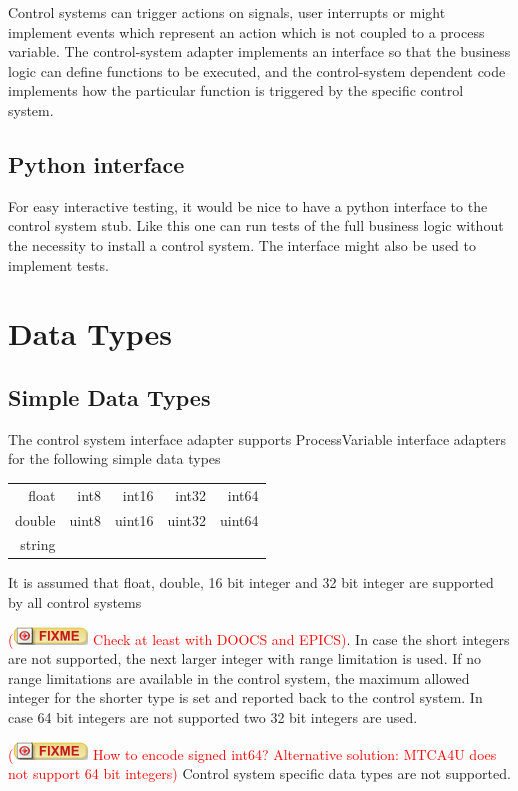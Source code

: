 \documentclass[11pt,a4paper]{scrartcl}
\newcounter{nFixmes}
\newcommand{\fixme}[1]{\addtocounter{nFixmes}{1}\textcolor{red}{(\includegraphics[height=2ex]{fixme} #1)}\xspace}
\begin{document}
Control systems can trigger actions on signals, user interrupts or might
implement events which represent an action which is not coupled to a process
variable. The control-system adapter implements an interface so that the
business logic can define functions to be executed, and the control-system
dependent code implements how the particular function is triggered by the
specific control system. 

\subsection{Python interface}

For easy interactive testing, it would be nice to have a python interface to
the control system stub. Like this one can run tests of the full business
logic without the necessity to install a control system. The interface might
also be used to implement tests. 

\section{Data Types}

\subsection{Simple Data Types}

The control system interface adapter supports ProcessVariable interface
adapters for the following simple data types\\[2ex] 
\begin{tabular}{rrrrr}
float & int8 & int16 & int32 & int64\\
double & uint8 & uint16 & uint32 & uint64 \\
string\\[2ex]
\end{tabular}

It is assumed that float, double, 16 bit integer and 32 bit integer are
supported by all control systems \fixme{Check at least with DOOCS and
  EPICS}. In case the short integers are not supported, the next larger
integer with range limitation is used. If no range limitations are available
in the control system, the maximum allowed integer for the shorter type is set
and reported back to the control system. In case 64 bit integers are not
supported two 32 bit integers are used. \fixme{How to encode signed int64?
  Alternative solution: MTCA4U does not support 64 bit integers} 
Control system specific data types are not supported.
\end{document}
